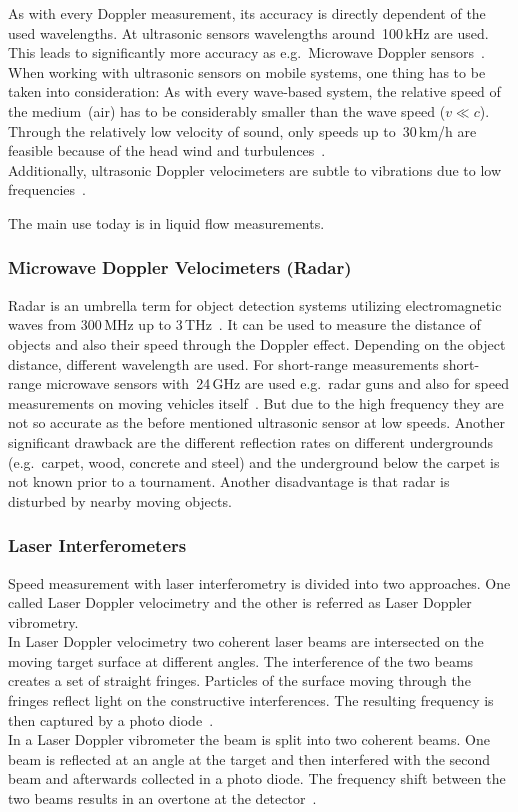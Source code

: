\documentclass[12pt,a4paper]{article}
\begin{document}
As with every Doppler measurement, its accuracy is directly dependent of the used wavelengths.
At ultrasonic sensors wavelengths around~100\,kHz are used. 
This leads to significantly more accuracy as e.g.\ Microwave Doppler sensors~\cite{ultrasonic}.\\
When working with ultrasonic sensors on mobile systems, one thing has to be taken into consideration: 
As with every wave-based system, the relative speed of the medium~(air) has to be considerably smaller than the wave speed ($v \ll c$).
Through the relatively low velocity of sound, only speeds up to~30\,km/h are feasible because of the head wind and turbulences~\cite{ultrasonic}.\\
Additionally, ultrasonic Doppler velocimeters are subtle to vibrations due to low frequencies~\cite{agri}.

The main use today is in liquid flow measurements.



\subsubsection{Microwave Doppler Velocimeters (Radar)}

Radar is an umbrella term for object detection systems utilizing electromagnetic waves from 300\,MHz up to 3\,THz~\cite{nrt}.
It can be used to measure the distance of objects and also their speed through the Doppler effect.
Depending on the object distance, different wavelength are used.
For short-range measurements short-range microwave sensors with~24\,GHz are used e.g.\ radar guns and also for speed measurements on moving vehicles itself~\cite{s_r_radar}.
But due to the high frequency they are not so accurate as the before mentioned ultrasonic sensor at low speeds.
Another significant drawback are the different reflection rates on different undergrounds (e.g.\ carpet, wood, concrete and steel) and the underground below the carpet is not known prior to a tournament.
Another disadvantage is that radar is disturbed by nearby moving objects.


\subsubsection{Laser Interferometers}

Speed measurement with laser interferometry is divided into two approaches.
One called Laser Doppler velocimetry and the other is referred as Laser Doppler vibrometry.\\
In Laser Doppler velocimetry two coherent laser beams are intersected on the moving target surface at different angles.
The interference of the two beams creates a set of straight fringes. 
Particles of the surface moving through the fringes reflect light on the constructive interferences.
The resulting frequency is then captured by a photo diode~\cite{laser_vel}.\\
In a Laser Doppler vibrometer the beam is split into two coherent beams.
One beam is reflected at an angle at the target and then interfered with the second beam and afterwards collected in a photo diode. 
The frequency shift between the two beams results in an overtone at the detector~\cite{vibro}.
\end{document}
